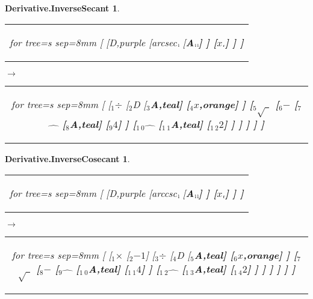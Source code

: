 \documentclass[UTF8,10pt]{ctexart}
\newcommand{\Bigskip}{\bigskip\medskip}
\newcommand{\subtreeA}{\bf A}
\newcommand{\I}{$_{\scriptscriptstyle 1}$}
\newcommand{\II}{$_{\scriptscriptstyle 2}$}
\newcommand{\III}{$_{\scriptscriptstyle 3}$}
\newcommand{\IV}{$_{\scriptscriptstyle 4}$}
\newcommand{\V}{$_{\scriptscriptstyle 5}$}
\newcommand{\VI}{$_{\scriptscriptstyle 6}$}
\newcommand{\VII}{$_{\scriptscriptstyle 7}$}
\newcommand{\VIII}{$_{\scriptscriptstyle 8}$}
\newcommand{\IX}{$_{\scriptscriptstyle 9}$}
\newcommand{\X}{$_{\scriptscriptstyle 1\:\!\!0}$}
\newcommand{\XI}{$_{\scriptscriptstyle 1\:\!\!1}$}
\newcommand{\XII}{$_{\scriptscriptstyle 1\:\!\!2}$}
\newcommand{\XIII}{$_{\scriptscriptstyle 1\:\!\!3}$}
\newcommand{\XIV}{$_{\scriptscriptstyle 1\:\!\!4}$}
\newcommand{\lc}{$_{\:\!\scriptscriptstyle\rm l\!}$}
\newcommand{\rc}{$_{\:\!\scriptscriptstyle\rm r\!}$}
\newcommand{\Derivative}{\rm D}
\newcommand{\x}{$x$}
\newcommand{\NegativeOne}{$-1$}
\newcommand{\Two}{$2$}
\newcommand{\Four}{$4$}
\newcommand{\Subtraction}{$-$}
\newcommand{\Multiplication}{$\times$}
\newcommand{\Division}{$\div$}
\newcommand{\Power}{$\hat{\quad}$}
\newcommand{\SquareRoot}{$\sqrt{\ \ }$}
\newcommand{\InverseSecant}{\rm arcsec}
\newcommand{\InverseCosecant}{\rm arccsc}
\newtheorem*{Derivative.InverseSecant}{\bf Derivative.InverseSecant }
\newtheorem*{Derivative.InverseCosecant}{\bf Derivative.InverseCosecant }
\begin{document}
	\newpage

	\begin{center}\vspace*{\fill}
		\begin{Derivative.InverseSecant}
			\qquad\par\Bigskip
			\begin{tabular}{c}
				\begin{forest}
					for tree={s sep=8mm}
					[
						[\Derivative,purple
							[\InverseSecant\lc
								[\subtreeA\lc\lc]
							]
							[\x\rc]
						]
					]
				\end{forest}
			\end{tabular}
			\qquad
			$\longrightarrow$
			\qquad
			\begin{tabular}{c}
				\begin{forest}
					for tree={s sep=8mm}
					[
						[\I\Division
							[\II\Derivative
								[\III\subtreeA,teal]
								[\IV\x,orange]
							]
							[\V\SquareRoot
								[\VI\Subtraction
									[\VII\Power
										[\VIII\subtreeA,teal]
										[\IX\Four]
									]
									[\X\Power
										[\XI\subtreeA,teal]
										[\XII\Two]
									]
								]
							]
						]
					]
				\end{forest}
			\end{tabular}
		\end{Derivative.InverseSecant}
		\bigskip
		\begin{Derivative.InverseCosecant}
			\qquad\par\Bigskip
			\begin{tabular}{c}
				\begin{forest}
					for tree={s sep=8mm}
					[
						[\Derivative,purple
							[\InverseCosecant\lc
								[\subtreeA\lc\lc]
							]
							[\x\rc]
						]
					]
				\end{forest}
			\end{tabular}
			\qquad
			$\longrightarrow$
			\qquad
			\begin{tabular}{c}
				\begin{forest}
					for tree={s sep=8mm}
					[
						[\I\Multiplication
							[\II\NegativeOne]
							[\III\Division
								[\IV\Derivative
									[\V\subtreeA,teal]
									[\VI\x,orange]
								]
								[\VII\SquareRoot
									[\VIII\Subtraction
										[\IX\Power
											[\X\subtreeA,teal]
											[\XI\Four]
										]
										[\XII\Power
											[\XIII\subtreeA,teal]
											[\XIV\Two]
										]
									]
								]
							]
						]
					]
				\end{forest}
			\end{tabular}
		\end{Derivative.InverseCosecant}
	\vspace*{\fill}\end{center}
\end{document}
